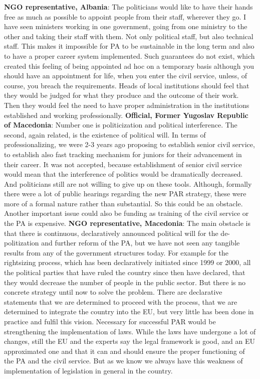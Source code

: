 \textbf{NGO representative, Albania}: The politicians would like to have their hands free as much as possible to appoint people from their staff, wherever they go. I have seen ministers working in one government, going from one ministry to the other and taking their staff with them. Not only political staff, but also technical staff. This makes it impossible for PA to be sustainable in the long term and also to have a proper career system implemented. Such guarantees do not exist, which created this feeling of being appointed ad hoc on a temporary basis although you should have an appointment for life, when you enter the civil service, unless, of course, you breach the requirements. Heads of local institutions should feel that they would be judged for what they produce and the outcome of their work. Then they would feel the need to have proper administration in the institutions established and working professionally. 
\textbf{Official, Former Yugoslav Republic of Macedonia}: Number one is politicization and political interference. The second, again related, is the existence of political will. In terms of professionalizing, we were 2-3 years ago proposing to establish senior civil service, to establish also fast tracking mechanism for juniors for their advancement in their career. It was not accepted, because establishment of senior civil service would mean that the interference of politics would be dramatically decreased. And politicians still are not willing to give up on these tools. Although, formally there were a lot of public hearings regarding the new PAR strategy, these were more of a formal nature rather than substantial. So this could be an obstacle. Another important issue could also be funding as training of the civil service or the PA is expensive.
\textbf{NGO representative,  Macedonia}: The main obstacle is that there is continuous, declaratively announced political will for the de-politization and further reform of the PA, but we have not seen any tangible results from any of the government structures today. For example for the rightsizing process, which has been declaratively initiated since 1999 or 2000, all the political parties that have ruled the country since then have declared, that they would decrease the number of people in the public sector. But there is no concrete strategy until now to solve the problem. There are declarative statements that we are determined to proceed with the process, that we are determined to integrate the country into the EU, but very little has been done in practice and fulfil this vision. Necessary for successful PAR would be strengthening the implementation of laws. While the laws have undergone a lot of changes, still the EU and the experts say the legal framework is good, and an EU approximated one and that it can and should ensure the proper functioning of the PA and the civil service. But as we know we always have this weakness of implementation of legislation in general in the country.
